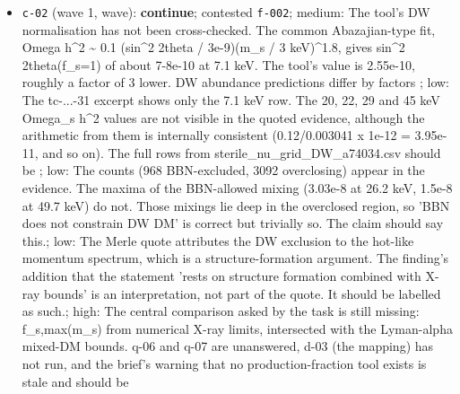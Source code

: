 \documentclass[11pt,a4paper]{article}
\begin{document}
\begin{itemize}
  \item \texttt{c-02} (wave 1, wave): \textbf{continue}; contested \texttt{f-002}; medium: The tool's DW normalisation has not been cross-checked. The common Abazajian-type fit, Omega h\textasciicircum{}2 \textasciitilde{} 0.1 (sin\textasciicircum{}2 2theta / 3e-9)(m\_s / 3 keV)\textasciicircum{}1.8, gives sin\textasciicircum{}2 2theta(f\_s=1) of about 7-8e-10 at 7.1 keV. The tool's value is 2.55e-10, roughly a factor of 3 lower. DW abundance predictions differ by factors ; low: The tc-...-31 excerpt shows only the 7.1 keV row. The 20, 22, 29 and 45 keV Omega\_s h\textasciicircum{}2 values are not visible in the quoted evidence, although the arithmetic from them is internally consistent (0.12/0.003041 x 1e-12 = 3.95e-11, and so on). The full rows from sterile\_nu\_grid\_DW\_a74034.csv should be ; low: The counts (968 BBN-excluded, 3092 overclosing) appear in the evidence. The maxima of the BBN-allowed mixing (3.03e-8 at 26.2 keV, 1.5e-8 at 49.7 keV) do not. Those mixings lie deep in the overclosed region, so 'BBN does not constrain DW DM' is correct but trivially so. The claim should say this.; low: The Merle quote attributes the DW exclusion to the hot-like momentum spectrum, which is a structure-formation argument. The finding's addition that the statement 'rests on structure formation combined with X-ray bounds' is an interpretation, not part of the quote. It should be labelled as such.; high: The central comparison asked by the task is still missing: f\_s,max(m\_s) from numerical X-ray limits, intersected with the Lyman-alpha mixed-DM bounds. q-06 and q-07 are unanswered, d-03 (the mapping) has not run, and the brief's warning that no production-fraction tool exists is stale and should be 

\end{itemize}
\end{document}
